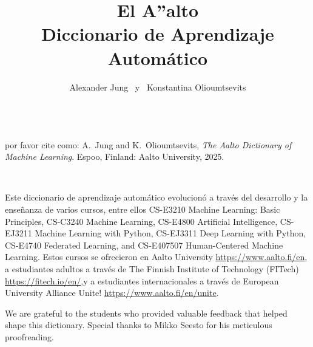 \documentclass[journal,12pt,onecolumn]{article}
\begin{document}


\title {\vspace*{10mm}
	{\huge {\bf El {\fontsize{40}{48}\selectfont \textbf{\textsf{A\hspace*{-2mm}''}}}\hspace*{-4mm}alto \\  Diccionario de Aprendizaje Automático}}  \\[-5mm] 
}

\author{\hspace{-2mm}Alexander Jung \ y \ Konstantina Olioumtsevits \\[-2mm]%
}

\maketitle
	\begin{center}
		\\[10mm]
{\large	por favor cite como: A.\ Jung and K.\ Olioumtsevits, \textit{The Aalto Dictionary of Machine Learning}. Espoo, Finland: Aalto University, 2025.}
\end{center}

\newpage 
{}\

\noindent Este diccionario de aprendizaje automático evolucionó a través del desarrollo y la enseñanza de varios cursos, entre ellos CS-E3210 Machine Learning: Basic Principles, 
CS-C3240 Machine Learning, CS-E4800 Artificial Intelligence, CS-EJ3211 Machine Learning with Python, 
CS-EJ3311 Deep Learning with Python, CS-E4740 Federated Learning, and 
CS-E407507 Human-Centered Machine Learning. Estos cursos se ofrecieron en
Aalto University \url{https://www.aalto.fi/en}, a estudiantes adultos a través de 
The Finnish Institute of Technology (FITech) \url{https://fitech.io/en/},y a estudiantes internacionales a través de European University Alliance Unite! \url{https://www.aalto.fi/en/unite}.

\noindent We are grateful to the students who provided valuable feedback that helped shape this dictionary. 
Special thanks to Mikko Seesto for his meticulous proofreading.
\end{document}
